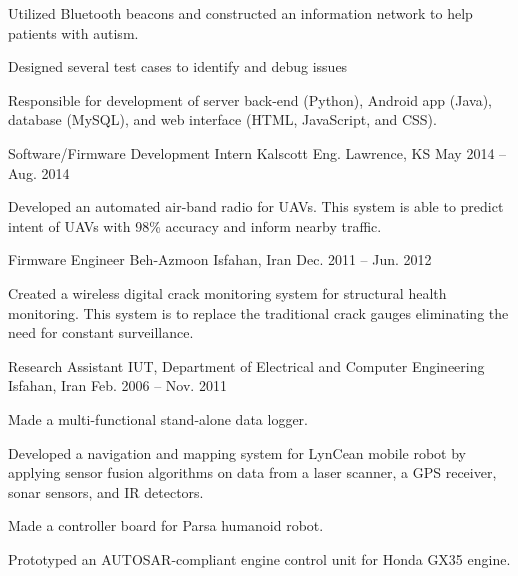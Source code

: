 \begin{cventries}
{\begin{cvitems}
        \item Utilized Bluetooth beacons and constructed an information network to help patients with autism.
        \item Designed several test cases to identify and debug issues
        \item Responsible for development of server back-end (Python), Android app (Java), database (MySQL), and web interface (HTML, JavaScript, and CSS).
      \end{cvitems}
    }
  \cventry
    {Software/Firmware Development Intern}
    {Kalscott Eng.}
    {Lawrence, KS}
    {May 2014 -- Aug. 2014}
    {
      \begin{cvitems}
        \item Developed an automated air-band radio for UAVs. This system is able to predict intent of UAVs with 98\% accuracy and inform nearby traffic.
      \end{cvitems}
    }
  \cventry
    {Firmware Engineer}
    {Beh-Azmoon}
    {Isfahan, Iran}
    {Dec. 2011 -- Jun. 2012}
    {
      \begin{cvitems}
        \item Created a wireless digital crack monitoring system for structural health monitoring. This system is to replace the traditional crack gauges eliminating the need for constant surveillance.
      \end{cvitems}
    }
  \cventry
    {Research Assistant}
    {IUT, Department of Electrical and Computer Engineering}
    {Isfahan, Iran}
    {Feb. 2006 -- Nov. 2011}
    {
      \begin{cvitems}
        \item Made a multi-functional stand-alone data logger.
        \item Developed a navigation and mapping system for LynCean mobile robot by applying sensor fusion algorithms on data from a laser scanner, a GPS receiver, sonar sensors, and IR detectors.
        \item Made a controller board for Parsa humanoid robot.
        \item Prototyped an AUTOSAR-compliant engine control unit for Honda GX35 engine.
      \end{cvitems}
    }
\end{cventries} 